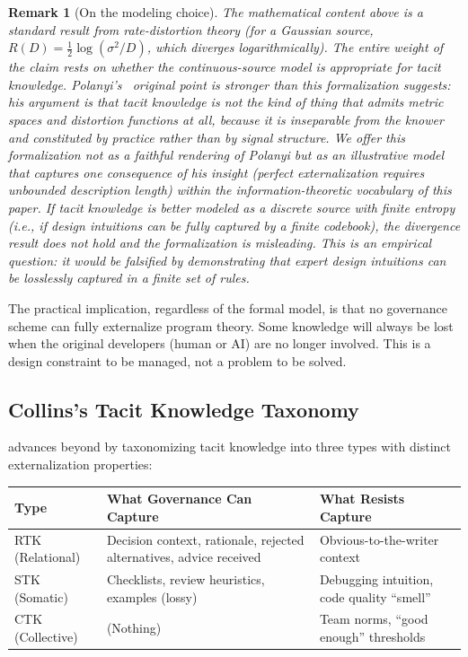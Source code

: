 \documentclass[11pt, a4paper, logo, copyright]{googledeepmind}
\newtheorem*{remark}{Remark}
\begin{document}
\begin{remark}[On the modeling choice]
The mathematical content above is a standard result from rate-distortion theory (for a Gaussian source, $R(D) = \frac{1}{2}\log(\sigma^2/D)$, which diverges logarithmically). The entire weight of the claim rests on whether the continuous-source model is appropriate for tacit knowledge. Polanyi's~\citep{polanyi1966} original point is stronger than this formalization suggests: his argument is that tacit knowledge is not the kind of thing that admits metric spaces and distortion functions at all, because it is inseparable from the knower and constituted by practice rather than by signal structure. We offer this formalization not as a faithful rendering of Polanyi but as an illustrative model that captures one consequence of his insight (perfect externalization requires unbounded description length) within the information-theoretic vocabulary of this paper. If tacit knowledge is better modeled as a discrete source with finite entropy (i.e., if design intuitions can be fully captured by a finite codebook), the divergence result does not hold and the formalization is misleading. This is an empirical question: it would be falsified by demonstrating that expert design intuitions can be losslessly captured in a finite set of rules.
\end{remark}

The practical implication, regardless of the formal model, is that no governance scheme can fully externalize program theory. Some knowledge will always be lost when the original developers (human or AI) are no longer involved. This is a design constraint to be managed, not a problem to be solved.

\subsection{Collins's Tacit Knowledge Taxonomy}

\citet{collins2010} advances beyond \citet{polanyi1966} by taxonomizing tacit knowledge into three types with distinct externalization properties:

\begin{center}
\begin{tabular}{lp{5cm}p{5cm}}
\toprule
Type & What Governance Can Capture & What Resists Capture \\
\midrule
RTK (Relational) & Decision context, rationale, rejected alternatives, advice received & Obvious-to-the-writer context \\
STK (Somatic) & Checklists, review heuristics, examples (lossy) & Debugging intuition, code quality ``smell'' \\
CTK (Collective) & (Nothing) & Team norms, ``good enough'' thresholds \\
\bottomrule
\end{tabular}
\end{center}
\end{document}
